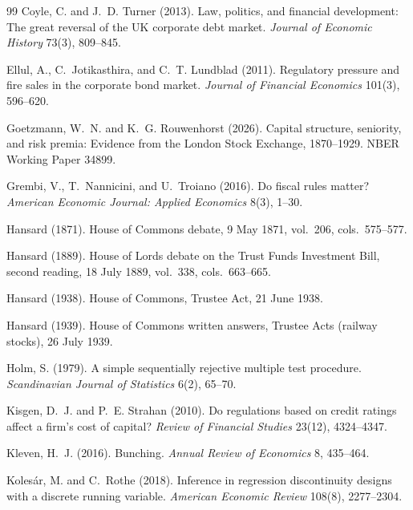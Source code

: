 \documentclass[11pt]{article}
\begin{document}
\begin{thebibliography}{99}
Coyle, C. and J.~D. Turner (2013). Law, politics, and financial development: The great reversal of the UK corporate debt market. \textit{Journal of Economic History} 73(3), 809--845.

Ellul, A., C.~Jotikasthira, and C.~T. Lundblad (2011). Regulatory pressure and fire sales in the corporate bond market. \textit{Journal of Financial Economics} 101(3), 596--620.

Goetzmann, W.~N. and K.~G. Rouwenhorst (2026). Capital structure, seniority, and risk premia: Evidence from the London Stock Exchange, 1870--1929. NBER Working Paper 34899.

Grembi, V., T.~Nannicini, and U.~Troiano (2016). Do fiscal rules matter? \textit{American Economic Journal: Applied Economics} 8(3), 1--30.

Hansard (1871). House of Commons debate, 9 May 1871, vol.~206, cols.~575--577.

Hansard (1889). House of Lords debate on the Trust Funds Investment Bill, second reading, 18 July 1889, vol.~338, cols.~663--665.

Hansard (1938). House of Commons, Trustee Act, 21 June 1938.

Hansard (1939). House of Commons written answers, Trustee Acts (railway stocks), 26 July 1939.

Holm, S. (1979). A simple sequentially rejective multiple test procedure. \textit{Scandinavian Journal of Statistics} 6(2), 65--70.

Kisgen, D.~J. and P.~E. Strahan (2010). Do regulations based on credit ratings affect a firm's cost of capital? \textit{Review of Financial Studies} 23(12), 4324--4347.

Kleven, H.~J. (2016). Bunching. \textit{Annual Review of Economics} 8, 435--464.

Koles{\'a}r, M. and C.~Rothe (2018). Inference in regression discontinuity designs with a discrete running variable. \textit{American Economic Review} 108(8), 2277--2304.


\end{thebibliography}
\end{document}
